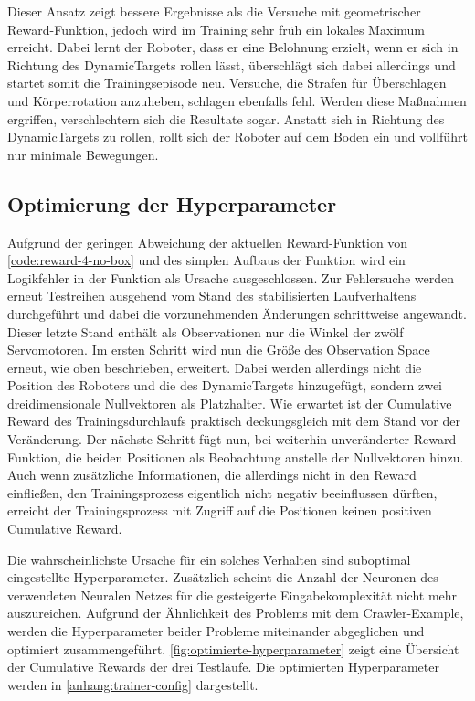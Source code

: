 Dieser Ansatz zeigt bessere Ergebnisse als die Versuche mit geometrischer Reward-Funktion, jedoch wird im Training sehr früh ein lokales Maximum erreicht.
Dabei lernt der Roboter, dass er eine Belohnung erzielt, wenn er sich in Richtung des DynamicTargets rollen lässt, überschlägt sich dabei allerdings und startet somit die Trainingsepisode neu.
Versuche, die Strafen für Überschlagen und Körperrotation anzuheben, schlagen ebenfalls fehl.
Werden diese Maßnahmen ergriffen, verschlechtern sich die Resultate sogar.
Anstatt sich in Richtung des DynamicTargets zu rollen, rollt sich der Roboter auf dem Boden ein und vollführt nur minimale Bewegungen.

\subsection{Optimierung der Hyperparameter}
Aufgrund der geringen Abweichung der aktuellen Reward-Funktion von \autoref{code:reward-4-no-box} und des simplen Aufbaus der Funktion wird ein Logikfehler in der Funktion als Ursache ausgeschlossen.
Zur Fehlersuche werden erneut Testreihen ausgehend vom Stand des stabilisierten Laufverhaltens durchgeführt und dabei die vorzunehmenden Änderungen schrittweise angewandt.
Dieser letzte Stand enthält als Observationen nur die Winkel der zwölf Servomotoren.
Im ersten Schritt wird nun die Größe des Observation Space erneut, wie oben beschrieben, erweitert.
Dabei werden allerdings nicht die Position des Roboters und die des DynamicTargets hinzugefügt, sondern zwei dreidimensionale Nullvektoren als Platzhalter.
Wie erwartet ist der Cumulative Reward des Trainingsdurchlaufs praktisch deckungsgleich mit dem Stand vor der Veränderung.
Der nächste Schritt fügt nun, bei weiterhin unveränderter Reward-Funktion, die beiden Positionen als Beobachtung anstelle der Nullvektoren hinzu.
Auch wenn zusätzliche Informationen, die allerdings nicht in den Reward einfließen, den Trainingsprozess eigentlich nicht negativ beeinflussen dürften, erreicht der Trainingsprozess mit Zugriff auf die Positionen keinen positiven Cumulative Reward.

Die wahrscheinlichste Ursache für ein solches Verhalten sind suboptimal eingestellte Hyperparameter.
Zusätzlich scheint die Anzahl der Neuronen des verwendeten Neuralen Netzes für die gesteigerte Eingabekomplexität nicht mehr auszureichen.
Aufgrund der Ähnlichkeit des Problems mit dem Crawler-Example, werden die Hyperparameter beider Probleme miteinander abgeglichen und optimiert zusammengeführt.
\autoref{fig:optimierte-hyperparameter} zeigt eine Übersicht der Cumulative Rewards der drei Testläufe.
Die optimierten Hyperparameter werden in \autoref{anhang:trainer-config} dargestellt.


